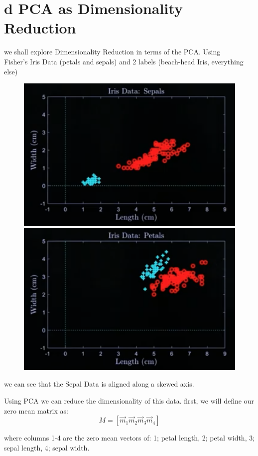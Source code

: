 \documentclass[12pt]{book}
\begin{document}
\section*{d PCA as Dimensionality Reduction}
we shall explore Dimensionality Reduction in terms of the PCA.
Using\\ Fisher's Iris Data (petals and sepals) and 2 labels 
(beach-head Iris, everything else)
\begin{figure}[h]
        \centering
        \includegraphics[scale=0.5]{./figures/sepal.png}
        \includegraphics[scale=0.5]{./figures/petal.png}
\end{figure}

we can see that the Sepal Data is aligned along a skewed axis. 

Using PCA we can reduce the dimensionality of this data. 
first, we will define our zero mean matrix as:
\[M = [\vec m_1\vec m_2\vec m_3\vec m_4]\]

where columns 1-4 are the zero mean vectors of: 1; petal length,
2; petal width, 3; sepal length, 4; sepal width.
\end{document}
